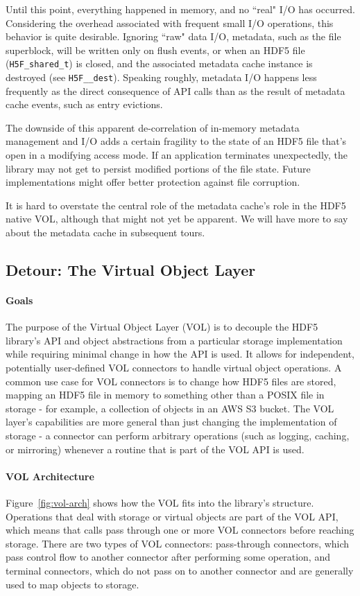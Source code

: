 Until this point, everything happened in memory, and no ``real" I/O has occurred. Considering the overhead associated with frequent small I/O operations, this behavior is quite desirable. Ignoring ``raw" data I/O, metadata, such as the file superblock, will be written only on flush events, or when an HDF5 file (\texttt{H5F\_shared\_t}) is closed, and the associated metadata cache instance is destroyed (see \texttt{H5F\_\_dest}). Speaking roughly, metadata I/O happens less frequently as the direct consequence of API calls than as the result of metadata cache events, such as entry evictions.

The downside of this apparent de-correlation of in-memory metadata management and I/O adds a certain fragility to the state of an HDF5 file that's open in a modifying access mode. If an application terminates unexpectedly, the library may not get to persist modified portions of the file state. Future implementations might offer better protection against file corruption.

It is hard to overstate the central role of the metadata cache's role in the HDF5 native VOL, although that might not yet be apparent. We will have more to say about the metadata cache in subsequent tours.

\subsection{Detour: The Virtual Object Layer}\label{sec:vol}

\paragraph{Goals} The purpose of the Virtual Object Layer (VOL) is to decouple the HDF5 library's API and object abstractions from a particular storage implementation while requiring minimal change in how the API is used. It allows for independent, potentially user-defined VOL connectors to handle virtual object operations. A common use case for VOL connectors is to change how HDF5 files are stored, mapping an HDF5 file in memory to something other than a POSIX file in storage - for example, a collection of objects in an AWS S3 bucket. The VOL layer's capabilities are more general than just changing the implementation of storage - a connector can perform arbitrary operations (such as logging, caching, or mirroring) whenever a routine that is part of the VOL API is used.

\paragraph{VOL Architecture}  Figure~\ref{fig:vol-arch} shows how the VOL fits into the library's structure. Operations that deal with storage or virtual objects are part of the VOL API, which means that calls pass through one or more VOL connectors before reaching storage. There are two types of VOL connectors: pass-through connectors, which pass control flow to another connector after performing some operation, and terminal connectors, which do not pass on to another connector and are generally used to map objects to storage. 


